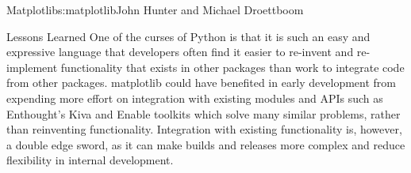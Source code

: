 \begin{aosachapter}{Matplotlib}{s:matplotlib}{John Hunter and Michael Droettboom}
\begin{aosasect1}{Lessons Learned}
One of the curses of Python is that it is such an easy and expressive
language that developers often find it easier to re-invent and
re-implement functionality that exists in other packages than
work to integrate code from other packages.  matplotlib could have
benefited in early development from expending more effort on
integration with existing modules and APIs such as Enthought's Kiva
and Enable toolkits which solve many similar problems, rather than
reinventing functionality.  Integration with existing functionality
is, however, a double edge sword, as it can make builds and releases
more complex and reduce flexibility in internal development.

\end{aosasect1}
\end{aosachapter}
